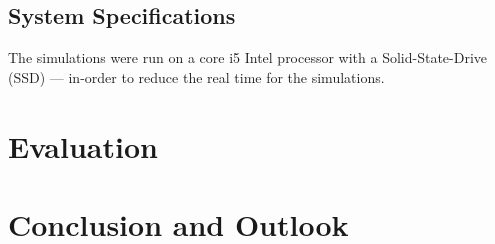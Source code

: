 \documentclass{listhesis}
\begin{document}
\section{System Specifications}
The simulations were run on a core i5 Intel processor with a Solid-State-Drive (SSD) --- in-order to reduce the real time for the simulations. 
\chapter{Evaluation}

\chapter{Conclusion and Outlook}


\cleardoublepage



\confirmation
\end{document}
